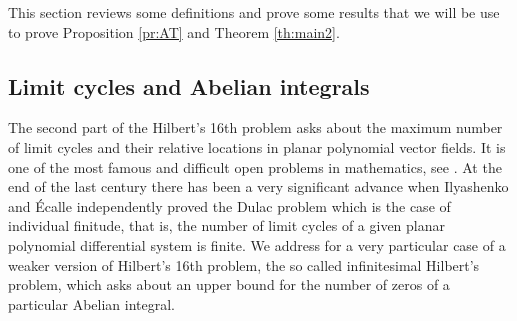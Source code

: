 \documentclass[12pt,a4paper,reqno]{amsart}
\begin{document}
    This section reviews some definitions and prove some results that we
    will be use to prove Proposition \ref{pr:AT} and Theorem \ref{th:main2}.


\subsection{Limit cycles and Abelian integrals}\label{ss:whp}


    The second part of the Hilbert's
     16th problem asks about the maximum number of limit cycles and their relative
         locations in planar polynomial vector fields.  It is one of the most
    famous and difficult open problems in mathematics, see \cite{Ily2002,Sma1998}. At the end of the last century
    there has been a very significant advance when Ilyashenko and \'Ecalle independently proved the Dulac problem which
        is the case of individual finitude, that is, the number of limit cycles of a given
        planar polynomial differential system is finite.  We
        address for a very particular case of a weaker version of Hilbert's 16th problem, the so called infinitesimal Hilbert's  problem,
         which asks about an upper bound for the number of zeros of a particular Abelian
         integral.
\end{document}
